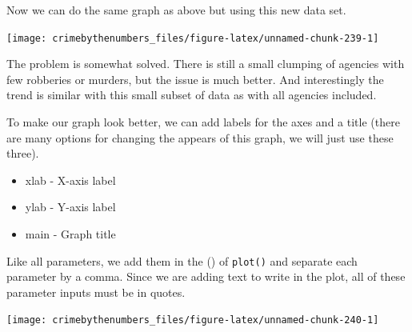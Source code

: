 \documentclass[
]{krantz}
\makeatletter
\newenvironment{Shaded}{\begin{snugshade}}{\end{snugshade}}
\newcommand{\AttributeTok}[1]{\textcolor[rgb]{0.61,0.61,0.61}{#1}}
\newcommand{\FunctionTok}[1]{\textcolor[rgb]{0,0,0}{#1}}
\newcommand{\NormalTok}[1]{#1}
\newcommand{\SpecialCharTok}[1]{\textcolor[rgb]{0,0,0}{#1}}
\newcommand{\StringTok}[1]{\textcolor[rgb]{0.5,0.5,0.5}{#1}}
\providecommand{\tightlist}{%
  \setlength{\itemsep}{0pt}\setlength{\parskip}{0pt}}
\newenvironment{kframe}{%
\medskip{}
\setlength{\fboxsep}{.8em}
 \def\at@end@of@kframe{}%
 \ifinner\ifhmode%
  \def\at@end@of@kframe{\end{minipage}}%
  \begin{minipage}{\columnwidth}%
 \fi\fi%
 \def\FrameCommand##1{\hskip\@totalleftmargin \hskip-\fboxsep
 \colorbox{shadecolor}{##1}\hskip-\fboxsep
     \hskip-\linewidth \hskip-\@totalleftmargin \hskip\columnwidth}%
 \MakeFramed {\advance\hsize-\width
   \@totalleftmargin\z@ \linewidth\hsize
   \@setminipage}}%
 {\par\unskip\endMakeFramed%
 \at@end@of@kframe}
\renewenvironment{Shaded}{\begin{kframe}}{\end{kframe}}
\makeatother
\begin{document}
Now we can do the same graph as above but using this new
data set.

\begin{Shaded}
\end{Shaded}

\begin{center}\texttt{[image: crimebythenumbers\_files/figure-latex/unnamed-chunk-239-1]} \end{center}

The problem is somewhat solved. There is still a small
clumping of agencies with few robberies or murders, but the
issue is much better. And interestingly the trend is similar
with this small subset of data as with all agencies
included.

To make our graph look better, we can add labels for the
axes and a title (there are many options for changing the
appears of this graph, we will just use these three).

\begin{itemize}
\tightlist
\item
  xlab - X-axis label
\item
  ylab - Y-axis label
\item
  main - Graph title
\end{itemize}

Like all parameters, we add them in the () of
\texttt{plot()} and separate each parameter by a comma.
Since we are adding text to write in the plot, all of these
parameter inputs must be in quotes.

\begin{Shaded}
\end{Shaded}

\begin{center}\texttt{[image: crimebythenumbers\_files/figure-latex/unnamed-chunk-240-1]} \end{center}
\end{document}
